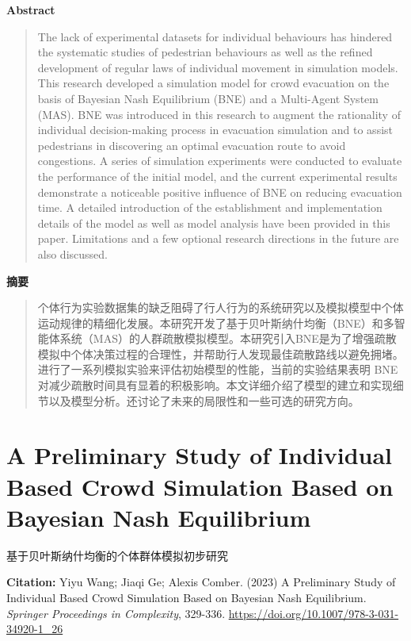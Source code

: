\vspace{1.5em}
\noindent\textbf{Abstract}\par
\begin{quote}\small
The lack of experimental datasets for individual behaviours has hindered the systematic studies of pedestrian behaviours as well as the refined development of regular laws of individual movement in simulation models. This research developed a simulation model for crowd evacuation on the basis of Bayesian Nash Equilibrium (BNE) and a Multi-Agent System (MAS). BNE was introduced in this research to augment the rationality of individual decision-making process in evacuation simulation and to assist pedestrians in discovering an optimal evacuation route to avoid congestions. A series of simulation experiments were conducted to evaluate the performance of the initial model, and the current experimental results demonstrate a noticeable positive influence of BNE on reducing evacuation time. A detailed introduction of the establishment and implementation details of the model as well as model analysis have been provided in this paper. Limitations and a few optional research directions in the future are also discussed.
\end{quote}

\noindent\textbf{摘要}\par
\begin{quote}\small
个体行为实验数据集的缺乏阻碍了行人行为的系统研究以及模拟模型中个体运动规律的精细化发展。本研究开发了基于贝叶斯纳什均衡（BNE）和多智能体系统（MAS）的人群疏散模拟模型。本研究引入BNE是为了增强疏散模拟中个体决策过程的合理性，并帮助行人发现最佳疏散路线以避免拥堵。进行了一系列模拟实验来评估初始模型的性能，当前的实验结果表明 BNE 对减少疏散时间具有显着的积极影响。本文详细介绍了模型的建立和实现细节以及模型分析。还讨论了未来的局限性和一些可选的研究方向。
\end{quote}

\vspace{0.5em}
\chapter{A Preliminary Study of Individual Based Crowd Simulation Based on Bayesian Nash Equilibrium}
\begin{center}\small 基于贝叶斯纳什均衡的个体群体模拟初步研究\end{center}

\noindent\textbf{Citation:} Yiyu Wang; Jiaqi Ge; Alexis Comber. (2023) A Preliminary Study of Individual Based Crowd Simulation Based on Bayesian Nash Equilibrium. \textit{Springer Proceedings in Complexity}, 329-336. \url{https://doi.org/10.1007/978-3-031-34920-1_26}

